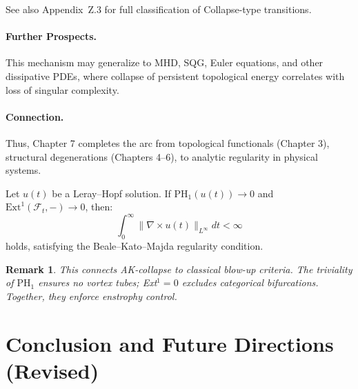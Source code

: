 \documentclass[11pt]{article}
\newtheorem{remark}[theorem]{Remark}
\begin{document}
See also Appendix~Z.3 for full classification of Collapse-type transitions.

\begin{center}

\vspace{0.5em}
\end{center}

\paragraph{Further Prospects.}
This mechanism may generalize to MHD, SQG, Euler equations, and other dissipative PDEs, where collapse of persistent topological energy correlates with loss of singular complexity.

\paragraph{Connection.}
Thus, Chapter 7 completes the arc from topological functionals (Chapter 3), structural degenerations (Chapters 4–6), to analytic regularity in physical systems.

\begin{lemma}
Let $u(t)$ be a Leray--Hopf solution. If $\mathrm{PH}_1(u(t)) \to 0$ and $\mathrm{Ext}^1(\mathcal{F}_t, -) \to 0$, then:
\[
\int_0^\infty \|\nabla \times u(t)\|_{L^\infty} dt < \infty
\]
holds, satisfying the Beale–Kato–Majda regularity condition.
\end{lemma}

\begin{remark}
This connects AK-collapse to classical blow-up criteria. The triviality of $\mathrm{PH}_1$ ensures no vortex tubes; Ext$^1 = 0$ excludes categorical bifurcations. Together, they enforce enstrophy control.
\end{remark}



\section{Conclusion and Future Directions (Revised)}
\end{document}

